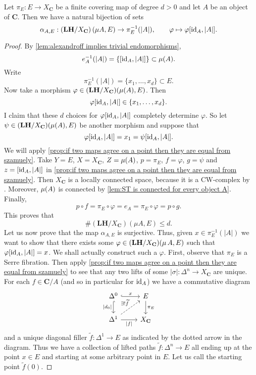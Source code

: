 \begin{proposition*}
\label{coro:number of LHs is d if the degree is d}
Let $\pi_E : E \to X_\mathbf{C}$ be a finite covering map of degree $d>0$ and let $A$ be an object of $\mathbf{C}$. Then we have a natural bijection of sets
\[ \alpha_{A,E} : \left(\mathbf{LH}/X_\mathbf{C} \right)\left(\mu A, E \right) \to \pi_E^{-1}(|A|), \qquad \varphi \mapsto \varphi[\operatorname{id}_A, |A|]. \]
\end{proposition*}
\begin{proof}
By \cref{lem:alexandroff implies trivial endomorphisms},
\[ e_A^{-1}(|A|) = \left\{ \left[ \operatorname{id}_A, |A| \right] \right\} \subset \operatorname{\mu}(A). \]
Write
\[ \pi_E^{-1}(|A|) = \{x_1,\ldots,x_d\} \subset E. \]
Now take a morphism $\varphi \in (\mathbf{LH}/X_{\mathbf{C}})(\operatorname{\mu}(A), E)$. Then
\[ \varphi[\operatorname{id}_A, |A|] \in \{x_1,\ldots,x_d\}. \]
I claim that these $d$ choices for $\varphi[\operatorname{id}_A,|A|]$ completely determine $\varphi$. 
So let $\psi \in (\mathbf{LH}/X_{\mathbf{C}})(\operatorname{\mu}(A),E)$ be another morphism and suppose that
\[ \varphi[\operatorname{id}_A,|A|] = x_1 = \psi[\operatorname{id}_A,|A|]. \]
We will apply \cref{prop:if two maps agree on a point then they are equal from szamuely}. 
Take $Y = E$, $X = X_{\mathbf{C}}$, $Z = \operatorname{\mu}(A)$, $p = \pi_E$, $f = \varphi$, $g = \psi$ and $z = [\operatorname{id}_A,|A|]$ in \cref{prop:if two maps agree on a point then they are equal from szamuely}. 
Then $X_{\mathbf{C}}$ is a locally connected space, because it is a CW-complex by \cite[Proposition I.2.3]{goersjardinne09}. Moreover, $\operatorname{\mu}(A)$ is connected by \cref{lem:ST is connected for every object A}. Finally,
\[ p \circ f = \pi_E \circ \varphi = e_A = \pi_E \circ \varphi = p \circ g. \]
This proves that
\[ \# \left(\mathbf{LH}/X_\mathbf{C} \right)\left(\mu A, E \right) \leq d. \]
Let us now prove that the map $\alpha_{A,E}$ is surjective. 
Thus, given $x \in \pi_E^{-1}(|A|)$ we want to show that there exists some $\varphi \in (\mathbf{LH}/X_{\mathbf{C}})(\operatorname{\mu} A, E)$ such that $\varphi[\operatorname{id}_A,|A|] = x$. We shall actually construct such a $\varphi$. First, observe that $\pi_E$ is a Serre fibration. Then apply \cref{prop:if two maps agree on a point then they are equal from szamuely} to see that any two lifts of some $|\sigma| : \Delta^n \to X_{\mathbf{C}}$ are unique. For each $f \in \mathbf{C}/A$ (and so in particular for $\operatorname{id}_A$) we have a commutative diagram
\[ \begin{tikzcd}
\Delta^0 \arrow[hook]{r}{x} \arrow[hook, swap]{d}{|d_0|} & E \arrow{d}{\pi_E} \\
\Delta^1 \arrow[swap]{r}{|f|} \arrow[dashed]{ur}{\exists ! \widetilde{f}} & X_{\mathbf{C}} \end{tikzcd} \]
and a unique diagonal filler $\widetilde{f} : \Delta^1 \to E$ as indicated by the dotted arrow in the diagram. Thus we have a collection of lifted paths $\widetilde{f} : \Delta^n \to E$ all ending up at the point $x \in E$ and starting at some arbitrary point in $E$. Let us call the starting point $\widetilde{f}(0)$. 


\end{proof}

